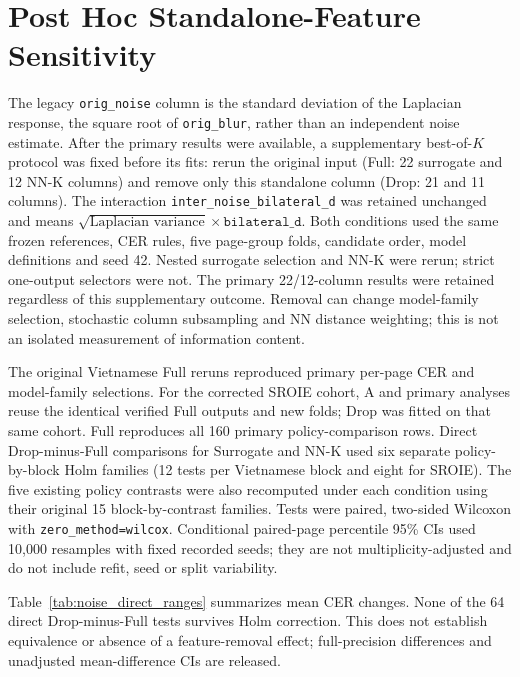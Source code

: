\documentclass{article}
\begin{document}
\section{Post Hoc Standalone-Feature Sensitivity}
\label{sec:noise_feature_sensitivity}

The legacy \texttt{orig\_noise} column is the standard deviation of the Laplacian response, the square root of \texttt{orig\_blur}, rather than an independent noise estimate. After the primary results were available, a supplementary best-of-$K$ protocol was fixed before its fits: rerun the original input (Full: 22 surrogate and 12 NN-K columns) and remove only this standalone column (Drop: 21 and 11 columns). The interaction \texttt{inter\_noise\_bilateral\_d} was retained unchanged and means $\sqrt{\text{Laplacian variance}}\times\texttt{bilateral\_d}$. Both conditions used the same frozen references, CER rules, five page-group folds, candidate order, model definitions and seed 42. Nested surrogate selection and NN-K were rerun; strict one-output selectors were not. The primary 22/12-column results were retained regardless of this supplementary outcome. Removal can change model-family selection, stochastic column subsampling and NN distance weighting; this is not an isolated measurement of information content.

The original Vietnamese Full reruns reproduced primary per-page CER and model-family selections. For the corrected SROIE cohort, A and primary analyses reuse the identical verified Full outputs and new folds; Drop was fitted on that same cohort. Full reproduces all 160 primary policy-comparison rows. Direct Drop-minus-Full comparisons for Surrogate and NN-K used six separate policy-by-block Holm families (12 tests per Vietnamese block and eight for SROIE). The five existing policy contrasts were also recomputed under each condition using their original 15 block-by-contrast families. Tests were paired, two-sided Wilcoxon with \texttt{zero\_method=wilcox}. Conditional paired-page percentile 95\% CIs used 10,000 resamples with fixed recorded seeds; they are not multiplicity-adjusted and do not include refit, seed or split variability.

Table~\ref{tab:noise_direct_ranges} summarizes mean CER changes. None of the 64 direct Drop-minus-Full tests survives Holm correction. This does not establish equivalence or absence of a feature-removal effect; full-precision differences and unadjusted mean-difference CIs are released.
\end{document}
